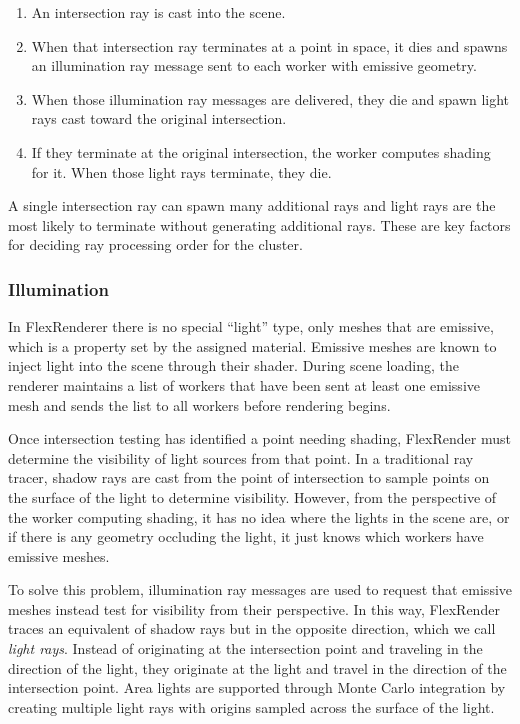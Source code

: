 \documentclass[a4paper,twoside]{article}
\begin{document}
\begin{enumerate}
    \item An intersection ray is cast into the scene.
    \item When that intersection ray terminates at a point in space, it dies and
        spawns an illumination ray message sent to each worker with emissive
        geometry.
    \item When those illumination ray messages are delivered, they die and spawn
        light rays cast toward the original intersection.
    \item  If they terminate at the
        original intersection, the worker computes shading for it. When those light rays terminate, they die.
\end{enumerate}

A single intersection ray can spawn many additional
rays and light rays are the most likely to terminate
without generating additional rays.  These are key factors for deciding ray processing order for the cluster.

\subsubsection{Illumination}
\label{illumination}

In FlexRenderer there is no special ``light'' type, only meshes that are emissive, which is a
property set by the assigned material. Emissive meshes are known to inject
light into the scene through their shader. During scene loading, the renderer
maintains a list of workers that have been sent at least one emissive mesh and
sends the list to all workers before rendering begins.

Once intersection testing has identified a point needing shading, FlexRender
must determine the visibility of light sources from that point. In a traditional
ray tracer, shadow rays are cast from the point of intersection to sample points
on the surface of the light to determine visibility. However, from the perspective
of the worker computing shading, it has no idea where the lights in the scene
are, or if there is any geometry occluding the light, it just knows which workers have emissive meshes.

To solve this problem, illumination ray messages are used to request that
emissive meshes instead test for visibility from their perspective.
In this way, FlexRender traces an equivalent of shadow rays but 
in the opposite direction, which we call \emph{light rays}. Instead of originating at the intersection point and
traveling in the direction of the light, they originate at the light and travel
in the direction of the intersection point. Area lights are supported through
Monte Carlo integration by creating multiple light rays with origins sampled
across the surface of the light.
\end{document}
